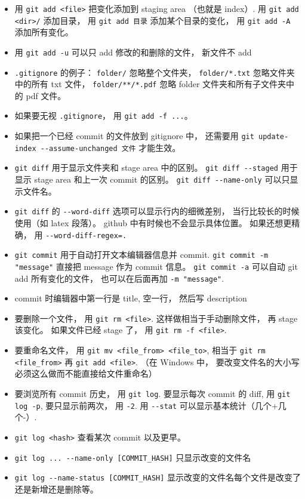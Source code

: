 \begin{itemize}
\item 用 \verb|git add <file>| 把变化添加到 staging area （也就是 index）. 用 \verb|git add <dir>/| 添加目录， 用 \verb|git add 目录| 添加某个目录的变化， 用 \verb|git add -A| 添加所有变化。
\item 用 \verb|git add -u| 可以只 add 修改的和删除的文件， 新文件不 add
\item \verb|.gitignore| 的例子： \verb|folder/| 忽略整个文件夹， \verb|folder/*.txt| 忽略文件夹中的所有 txt 文件， \verb|folder/**/*.pdf| 忽略 folder 文件夹和所有子文件夹中的 pdf 文件。
\item 如果要无视 \verb|.gitignore|， 用 \verb|git add -f ...|。
\item 如果把一个已经 commit 的文件放到 gitignore 中， 还需要用 \verb|git update-index --assume-unchanged 文件| 才能生效。
\item \verb|git diff| 用于显示文件夹和 stage area 中的区别。 \verb|git diff --staged| 用于显示 stage area 和上一次 commit 的区别。 \verb|git diff --name-only| 可以只显示文件名。
\item \verb|git diff| 的 \verb|--word-diff| 选项可以显示行内的细微差别， 当行比较长的时候使用（如 latex 段落）。 github 中有时候也不会显示具体位置。 如果还想更精确， 用 \verb|--word-diff-regex=.|
\item \verb|git commit| 用于自动打开文本编辑器信息并 commit. \verb|git commit -m "message"| 直接把 message 作为 commit 信息。 \verb|git commit -a| 可以自动 git add 所有变化的文件， 也可以在后面再加 \verb|-m "message"|.
\item commit 时编辑器中第一行是 title, 空一行， 然后写 description
\item 要删除一个文件， 用 \verb|git rm <file>|. 这样做相当于手动删除文件， 再 stage 该变化。 如果文件已经 stage 了， 用 \verb|git rm -f <file>|.
\item 要重命名文件， 用 \verb|git mv <file_from> <file_to>|, 相当于 \verb|git rm <file_from>| 再 \verb|git add <file>|. （在 Windows 中， 要改变文件名的大小写必须这么做而不能直接给文件重命名）
\item 要浏览所有 commit 历史， 用 \verb|git log|. 要显示每次 commit 的 diff, 用 \verb|git log -p|, 要只显示前两次， 用 \verb|-2|. 用 \verb|--stat| 可以显示基本统计（几个+几个-）.
\item \verb|git log <hash>| 查看某次 commit 以及更早。
\item \verb|git log ... --name-only [COMMIT_HASH]| 只显示改变的文件名
\item \verb|git log --name-status [COMMIT_HASH]| 显示改变的文件名每个文件是改变了还是新增还是删除等。

\end{itemize}
